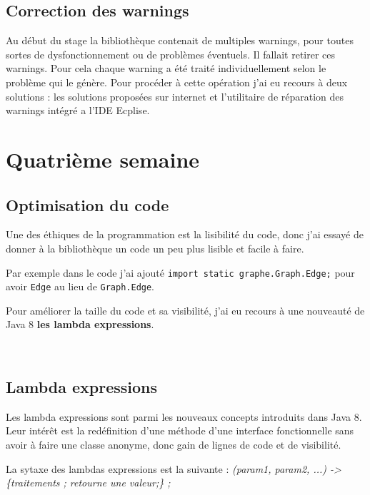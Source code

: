 \documentclass[12pt]{report}
\begin{document}
\subsection{Correction des warnings}

Au début du stage la bibliothèque contenait de multiples warnings, pour toutes sortes de dysfonctionnement ou de problèmes éventuels. Il fallait retirer ces warnings. Pour cela chaque warning a été traité individuellement selon le problème qui le génère. Pour procéder à cette opération j'ai eu recours à deux solutions : les solutions proposées sur internet et l'utilitaire de réparation des warnings intégré a l'IDE Ecplise.
~\\

\section{Quatrième semaine}

\subsection{Optimisation du code}

Une des éthiques de la programmation est la lisibilité du code, donc j'ai essayé de donner à la bibliothèque un code un peu plus lisible et facile à faire. \newline

Par exemple dans le code j'ai ajouté \texttt{import static graphe.Graph.Edge;} pour avoir \texttt{Edge} au lieu de \texttt{Graph.Edge}.\newline

Pour améliorer la taille du code et sa visibilité, j'ai eu recours à une nouveauté de Java 8 \textbf{les lambda expressions}.

\newpage
~\\
\subsection{Lambda expressions}

Les lambda expressions sont parmi les nouveaux concepts introduits dans Java 8. Leur intérêt est la redéfinition d'une méthode d'une interface fonctionnelle sans avoir à faire une classe anonyme, donc gain de lignes de code et de visibilité.\newline

La sytaxe des lambdas expressions est la suivante :\newline
\textit{(param1, param2, ...) -> \{traitements ; retourne une valeur;\} ;} \newline
\end{document}
